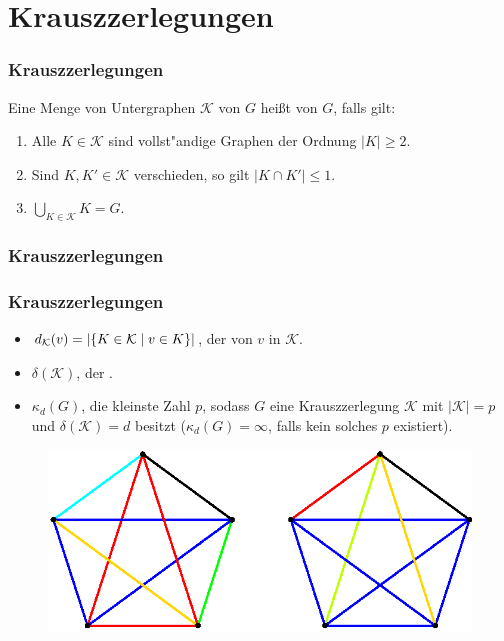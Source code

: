 \documentclass{beamer}
\begin{document}
\section{Krauszzerlegungen}

\begin{frame}[<+->]
  \frametitle{Krauszzerlegungen}
  Eine Menge von Untergraphen $\mathcal{K}$ von $G$ hei{\ss}t  von $G$, falls gilt:
  \pause
  \begin{enumerate}[<+->]
    \item Alle $K\in \mathcal{K}$ sind vollst"andige Graphen der Ordnung $|K| \geq 2$.
    \item Sind $K,K'\in \mathcal{K}$ verschieden, so gilt $|K\cap K'| \leq 1$.
    \item $\bigcup\limits_{K\in \mathcal{K}} K = G$.
  \end{enumerate}
\end{frame}

\begin{frame}
  \frametitle{Krauszzerlegungen}
  
\end{frame}

\begin{frame}[<+->]
  \frametitle{Krauszzerlegungen}
  \begin{itemize}[<+->]
    \item $d_{\mathcal{K}}(v) = | \{K\in \mathcal{K} \;|\; v\in K \}| $, der  von $v$ in $\mathcal{K}$.
    \item $\delta(\mathcal{K})$, der  .
    \item $\kappa_{d}(G)$, die kleinste Zahl $p$, sodass $G$ eine Krauszzerlegung $\mathcal{K}$ mit $|\mathcal{K}| = p$ und $\delta(\mathcal{K}) = d$ besitzt ($\kappa_{d}(G) = \infty$, falls kein solches $p$ existiert).
  \end{itemize}
   {
    \begin{figure}[h]
      \centering
      \includegraphics[width=\textwidth]{images/k5krauszdecomp}
    \end{figure} }
  \end{frame}
\end{document}
